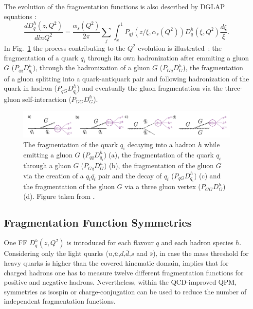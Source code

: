 The evolution of the fragmentation functions is also described by DGLAP equations \cite{Dokshitser, GL1, GL2, AP}:
%
\begin{equation}
  \frac{dD_q^h(z,Q^2)}{dlnQ^2} = \frac{\alpha_s(Q^2)}{2\pi}\sum\limits_j\int_{x}^{1}P_{qj}\left(z/\xi,\alpha_s(Q^2)\right)D_q^h(\xi,Q^2)\frac{d\xi}{\xi}.
\end{equation}
%
In Fig.~\ref{pic:QuarkFrag} the process contributing to the $Q^2$-evolution is illustrated~: the fragmentation of a quark $q_i$ through its own hadronization after emmiting a gluon $G$ ($P_{qq}D_{q_i}^h$), through the hadronization of a gluon $G$ ($P_{Gq}D_{G}^h$), the fragmentation of a gluon splitting into a quark-antiquark pair and following hadronization of the quark in hadron ($P_{qG}D_{q_i}^h$) and eventually the gluon fragmentation via the three-gluon self-interaction ($P_{GG}D_{G}^h$).

\begin{figure}[!h]
  \centering
	\includegraphics[scale=0.45]{./gfx/QuarkFrag.png}
	\caption{The fragmentation of the quark $q_i$ decaying into a hadron $h$ while emitting a gluon $G$ ($P_{qq}D^h_{q_{i}}$) (a), the fragmentation of the quark $q_i$ through a gluon $G$ ($P_{Gq}D^h_{G}$) (b), the fragmentation of the gluon $G$ via the creation of a $q_i \bar{q_i}$ pair and the decay of $q_i$ ($P_{qG}D^h_{q_{i}}$) (c) and the fragmentation of the gluon $G$ via a three gluon vertex ($P_{GG}D^h_{G}$) (d). Figure taken from \cite{Uematsu}.}
	\label{pic:QuarkFrag}
\end{figure}

\subsection{Fragmentation Function Symmetries}

One FF $D^h_q(z,Q^2)$ is introduced for each flavour $q$ and each hadron species $h$. Considering only the light quarks ($u$,$\bar{u}$,$d$,$\bar{d}$,$s$ and $\bar{s}$), in case the mass threshold for heavy quarks is higher than the covered kinematic domain, implies that for charged hadrons one has to measure twelve different fragmentation functions for positive and negative hadrons. Nevertheless, within the QCD-improved QPM, symmetries as isospin or charge-conjugation can be used to reduce the number of independent fragmentation functions.

